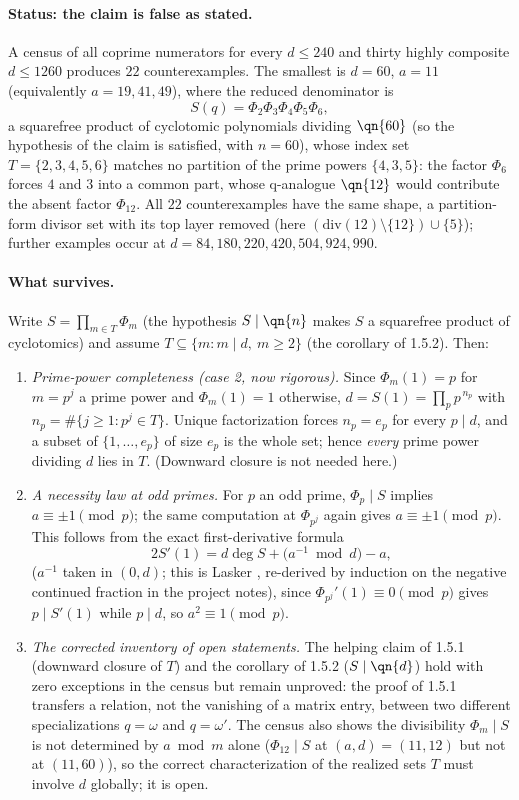 \paragraph{Status: the claim is false as stated.}
A census of all coprime numerators for every $d\le240$ and thirty highly
composite $d\le1260$ produces $22$ counterexamples. The smallest is $d=60$,
$a=11$ (equivalently $a=19,41,49$), where the reduced denominator is
\[
  S(q)=\Phi_2\Phi_3\Phi_4\Phi_5\Phi_6,
\]
a squarefree product of cyclotomic polynomials dividing $\qn{60}$ (so the
hypothesis of the claim is satisfied, with $n=60$), whose index set
$T=\{2,3,4,5,6\}$ matches no partition of the prime powers $\{4,3,5\}$: the
factor $\Phi_6$ forces $4$ and $3$ into a common part, whose q-analogue
$\qn{12}$ would contribute the absent factor $\Phi_{12}$. All $22$
counterexamples have the same shape, a partition-form divisor set with its top
layer removed (here $(\mathrm{div}(12)\setminus\{12\})\cup\{5\}$); further
examples occur at $d=84,180,220,420,504,924,990$.

\paragraph{What survives.} Write $S=\prod_{m\in T}\Phi_m$ (the hypothesis
$S\mid\qn{n}$ makes $S$ a squarefree product of cyclotomics) and assume
$T\subseteq\{m: m\mid d,\ m\ge2\}$ (the corollary of 1.5.2). Then:
\begin{enumerate}
  \item \emph{Prime-power completeness (case 2, now rigorous).} Since
  $\Phi_m(1)=p$ for $m=p^j$ a prime power and $\Phi_m(1)=1$ otherwise,
  $d=S(1)=\prod_p p^{\,n_p}$ with $n_p=\#\{j\ge1: p^j\in T\}$. Unique
  factorization forces $n_p=e_p$ for every $p\mid d$, and a subset of
  $\{1,\dots,e_p\}$ of size $e_p$ is the whole set; hence \emph{every} prime
  power dividing $d$ lies in $T$. (Downward closure is not needed here.)
  \item \emph{A necessity law at odd primes.} For $p$ an odd prime,
  $\Phi_p\mid S$ implies $a\equiv\pm1\pmod p$; the same computation at
  $\Phi_{p^j}$ again gives $a\equiv\pm1\pmod p$. This follows from the exact
  first-derivative formula
  \[
    2S'(1)=d\deg S+\bigl(a^{-1}\bmod d\bigr)-a,
  \]
  ($a^{-1}$ taken in $(0,d)$; this is Lasker \cite[Lem.~6.1,
  Cor.~6.2]{Lasker}, re-derived by induction on the negative continued
  fraction in the project notes), since $\Phi_{p^j}'(1)\equiv0\pmod p$ gives $p\mid S'(1)$ while
  $p\mid d$, so $a^2\equiv1\pmod p$.
  \item \emph{The corrected inventory of open statements.} The helping claim of
  1.5.1 (downward closure of $T$) and the corollary of 1.5.2 ($S\mid\qn{d}$)
  hold with zero exceptions in the census but remain unproved: the proof of
  1.5.1 transfers a relation, not the vanishing of a matrix entry, between two
  different specializations $q=\omega$ and $q=\omega'$. The census also shows
  the divisibility $\Phi_m\mid S$ is not determined by $a\bmod m$ alone
  ($\Phi_{12}\mid S$ at $(a,d)=(11,12)$ but not at $(11,60)$), so the correct
  characterization of the realized sets $T$ must involve $d$ globally; it is
  open.
\end{enumerate}
